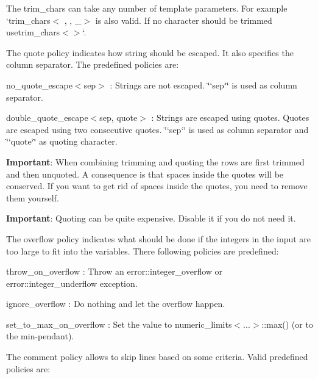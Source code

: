 The trim\+\_\+chars can take any number of template parameters. For example `trim\+\_\+chars$<$\textquotesingle{} \textquotesingle{}, \textquotesingle{}\textquotesingle{}, \textquotesingle{}\+\_\+\textquotesingle{}$>$ {\ttfamily is also valid. If no character should be trimmed use}trim\+\_\+chars$<$$>$`.

The quote policy indicates how string should be escaped. It also specifies the column separator. The predefined policies are\+:


\begin{DoxyItemize}
\item {\ttfamily no\+\_\+quote\+\_\+escape$<$sep$>$} \+: Strings are not escaped. \char`\"{}`sep`\char`\"{} is used as column separator.
\item {\ttfamily double\+\_\+quote\+\_\+escape$<$sep, quote$>$} \+: Strings are escaped using quotes. Quotes are escaped using two consecutive quotes. \char`\"{}`sep`\char`\"{} is used as column separator and \char`\"{}`quote`\char`\"{} as quoting character.
\end{DoxyItemize}

{\bfseries Important}\+: When combining trimming and quoting the rows are first trimmed and then unquoted. A consequence is that spaces inside the quotes will be conserved. If you want to get rid of spaces inside the quotes, you need to remove them yourself.

{\bfseries Important}\+: Quoting can be quite expensive. Disable it if you do not need it.

The overflow policy indicates what should be done if the integers in the input are too large to fit into the variables. There following policies are predefined\+:


\begin{DoxyItemize}
\item {\ttfamily throw\+\_\+on\+\_\+overflow} \+: Throw an {\ttfamily error\+::integer\+\_\+overflow} or {\ttfamily error\+::integer\+\_\+underflow} exception.
\item {\ttfamily ignore\+\_\+overflow} \+: Do nothing and let the overflow happen.
\item {\ttfamily set\+\_\+to\+\_\+max\+\_\+on\+\_\+overflow} \+: Set the value to {\ttfamily numeric\+\_\+limits$<$...$>$\+::max()} (or to the min-\/pendant).
\end{DoxyItemize}

The comment policy allows to skip lines based on some criteria. Valid predefined policies are\+:


